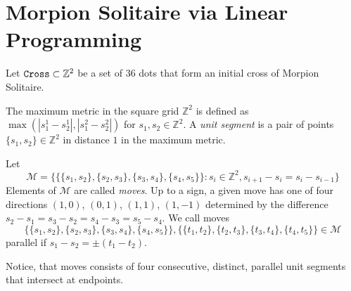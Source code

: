 \section{Morpion Solitaire via Linear Programming}
\label{sec:linear}

  Let $\texttt{Cross} \subset \mathbb{Z}^2$ be a set of $36$ dots that form an initial cross of Morpion Solitaire.
\begin{definition}
The maximum metric in the square grid $\mathbb{Z}^2$ is defined as $\max (|s_1^1-s_2^1|,|s_1^2-s_2^2|)$
for $s_1,s_2\in \mathbb{Z}^2$. 
A \emph{unit segment} is a pair of points $\{s_1,s_2\}\in \mathbb{Z}^2$ in distance $1$ in the maximum metric. %
\end{definition}


\begin{definition} Let 
    \[
      \mathcal{M} = \{ \{ \{s_1, s_2\}, \{s_2, s_3\}, \{s_3, s_4\}, \{s_4, s_5\} \} \colon s_i \in \mathbb{Z}^2, s_{i+1} - s_i = s_i - s_{i-1} \}
    \]
    Elements of $\mathcal{M}$ are called \emph{moves}. Up to a sign, a given move has one of four directions $(1,0)$, $(0,1)$, $(1,1)$, $(1,-1)$ determined by
the difference $s_{2} - s_1 = s_3 - s_2 = s_4 - s_3 = s_5 - s_4$. 
We call moves \[ \{ \{s_1, s_2\}, \{s_2, s_3\}, \{s_3, s_4\}, \{s_4, s_5\} \}, \{ \{t_1, t_2\}, \{t_2, t_3\}, \{t_3, t_4\}, \{t_4, t_5\} \}\in \mathcal{M}\]
parallel if $s_1-s_2 = \pm (t_1-t_2)$.  
\end{definition}

Notice, that moves consists of four consecutive, distinct, parallel unit segments that intersect at endpoints.


